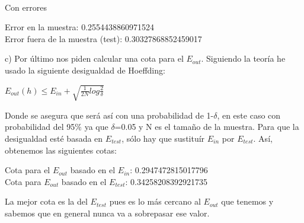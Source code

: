 \documentclass[12pt]{article}
\begin{document}
\\
Con errores 
\begin{center}
Error en la muestra:  0.2554438860971524\\
Error fuera de la muestra (test):  0.30327868852459017
\end{center}
c) Por último nos piden calcular una cota para el $E_{out}$. Siguiendo la teoría he usado la siguiente desigualdad de Hoeffding:
\begin{center}
$ E_{out}(h) \leq E_{in} + \sqrt{\frac{1}{2N}log \frac{2}{\delta}} $
\end{center}
Donde se asegura que será así con una probabilidad de 1-$\delta$, en este caso con probabilidad del 95$\%$ ya que $\delta$=0.05 y N es el tamaño de la muestra. Para que la desigualdad esté basada en $E_{test}$, sólo hay que sustituír $E_{in}$ por $E_{test}$. Así, obtenemos las siguientes cotas:\\
\begin{center}
Cota para el $E_{out}$ basado en el $E_{in}$:  0.2947472815017796 \\
Cota para $E_{out}$ basado en el $E_{test}$:  0.34258208392921735
\end{center}
La mejor cota es la del $E_{test}$ pues es lo más cercano al $E_{out}$ que tenemos y sabemos que en general nunca va a sobrepasar ese valor.







 
\end{document}

